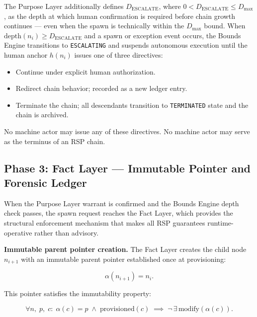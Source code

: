 The Purpose Layer additionally defines $D_{\text{ESCALATE}}$, where $0 < D_{\text{ESCALATE}} \leq D_{\max}$, as the depth at which human confirmation is required before chain growth continues — even when the spawn is technically within the $D_{\max}$ bound. When $\text{depth}(n_i) \geq D_{\text{ESCALATE}}$ and a spawn or exception event occurs, the Bounds Engine transitions to \texttt{ESCALATING} and suspends autonomous execution until the human anchor $h(n_i)$ issues one of three directives:

\begin{itemize}
    \item[\texttt{ACK}] Continue under explicit human authorization.
    \item[\texttt{RESOLVE}] Redirect chain behavior; recorded as a new ledger entry.
    \item[\texttt{REJECT}] Terminate the chain; all descendants transition to \texttt{TERMINATED} state and the chain is archived.
\end{itemize}

No machine actor may issue any of these directives. No machine actor may serve as the terminus of an RSP chain.

\subsection{Phase 3: Fact Layer — Immutable Pointer and Forensic Ledger}
\label{sec:rs-phase3}

When the Purpose Layer warrant is confirmed and the Bounds Engine depth check passes, the spawn request reaches the Fact Layer, which provides the structural enforcement mechanism that makes all RSP guarantees runtime-operative rather than advisory.

\medskip
\noindent\textbf{Immutable parent pointer creation.} The Fact Layer creates the child node $n_{i+1}$ with an immutable parent pointer established once at provisioning:

\begin{equation}
\alpha(n_{i+1}) = n_i .
\label{eq:rs-alpha-set}
\end{equation}

This pointer satisfies the immutability property:

\begin{equation}
\forall n,\; p,\; c:\;
\alpha(c) = p \;\land\; \text{provisioned}(c)
\;\implies\;
\neg\,\exists\,\text{modify}(\alpha(c)).
\label{eq:rs-pointer-immutability}
\end{equation}

